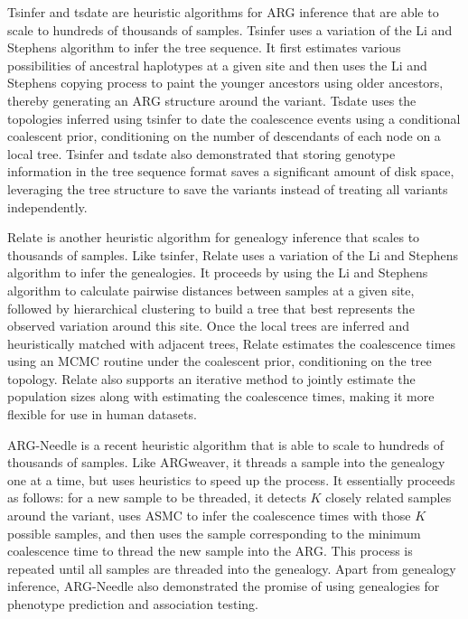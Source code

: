 Tsinfer \cite{Kelleher2019} and tsdate \cite{wohns2022unified} are heuristic algorithms for ARG inference that are able to scale to hundreds of thousands of samples. Tsinfer uses a variation of the Li and Stephens algorithm to infer the tree sequence. It first estimates various possibilities of ancestral haplotypes at a given site and then uses the Li and Stephens copying process to paint the younger ancestors using older ancestors, thereby generating an ARG structure around the variant. Tsdate uses the topologies inferred using tsinfer to date the coalescence events using a conditional coalescent prior, conditioning on the number of descendants of each node on a local tree. Tsinfer and tsdate also demonstrated that storing genotype information in the tree sequence format saves a significant amount of disk space, leveraging the tree structure to save the variants instead of treating all variants independently.

Relate \cite{speidel2019method} is another heuristic algorithm for genealogy inference that scales to thousands of samples. Like tsinfer, Relate uses a variation of the Li and Stephens algorithm to infer the genealogies. It proceeds by using the Li and Stephens algorithm to calculate pairwise distances between samples at a given site, followed by hierarchical clustering to build a tree that best represents the observed variation around this site. Once the local trees are inferred and heuristically matched with adjacent trees, Relate estimates the coalescence times using an MCMC routine under the coalescent prior, conditioning on the tree topology. Relate also supports an iterative method to jointly estimate the population sizes along with estimating the coalescence times, making it more flexible for use in human datasets.

ARG-Needle \cite{zhang2023biobank} is a recent heuristic algorithm that is able to scale to hundreds of thousands of samples. Like ARGweaver, it threads a sample into the genealogy one at a time, but uses heuristics to speed up the process. It essentially proceeds as follows: for a new sample to be threaded, it detects \(K\) closely related samples around the variant, uses ASMC \cite{palamara2018high} to infer the coalescence times with those \(K\) possible samples, and then uses the sample corresponding to the minimum coalescence time to thread the new sample into the ARG. This process is repeated until all samples are threaded into the genealogy. Apart from genealogy inference, ARG-Needle also demonstrated the promise of using genealogies for phenotype prediction and association testing.

